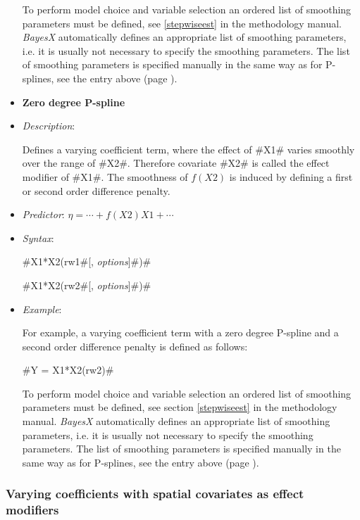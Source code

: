 \begin{itemize}
To perform model choice and variable selection an ordered list of smoothing
parameters must be defined, see \autoref{stepwiseest}
in the methodology manual. {\em BayesX} automatically defines an appropriate
list of smoothing parameters, i.e. it
is usually not necessary to  specify the smoothing parameters.
The list of smoothing parameters is specified manually in the same way as for P-splines,
see the entry above (page \pageref{psplines_stepwise}).


\item[]{\bf\sffamily Zero degree P-spline}

\item[] {\em Description}:

Defines a varying coefficient term, where the effect of #X1#
varies smoothly over the range of #X2#. Therefore covariate #X2#
is called the effect modifier of #X1#. The smoothness of $f(X2)$ is
induced by defining a first or second order difference penalty.

\item[] {\em Predictor}:
$\eta= \cdots + f(X2)X1 + \cdots$ \item[] {\em Syntax}:

#X1*X2(rw1#[, {\em options}]#)#

#X1*X2(rw2#[, {\em options}]#)#
\item[] {\em Example}:

For example, a varying coefficient term with a zero degree P-spline and a second order difference
penalty is defined as follows:

#Y = X1*X2(rw2)#


To perform model choice and variable selection an ordered list of smoothing parameters must be defined,
see section \autoref{stepwiseest} in the methodology manual. {\em BayesX} automatically defines an
appropriate list of smoothing parameters, i.e. it
is usually not necessary to  specify the smoothing parameters.
The list of smoothing parameters is specified manually in the same way as for P-splines,
see the entry above (page \pageref{psplines_stepwise}).

\end{itemize}

\subsubsection*{ Varying coefficients with spatial covariates as
effect modifiers}

